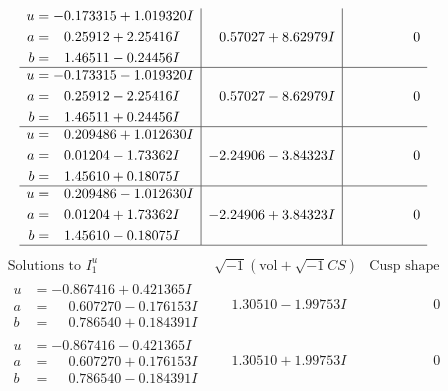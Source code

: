 \documentclass[1p]{elsarticle_modified}
\theoremstyle{definition}
\newcommand{\I}{\sqrt{-1}}
\begin{document}
$$\begin{array}{c|c|c}
\begin{aligned}
u &= -0.173315 + 1.019320 I \\
a &= \phantom{-}0.25912 + 2.25416 I \\
b &= \phantom{-}1.46511 - 0.24456 I\end{aligned}
 & \phantom{-}0.57027 + 8.62979 I & \phantom{-0.000000 } 0 \\ \hline\begin{aligned}
u &= -0.173315 - 1.019320 I \\
a &= \phantom{-}0.25912 - 2.25416 I \\
b &= \phantom{-}1.46511 + 0.24456 I\end{aligned}
 & \phantom{-}0.57027 - 8.62979 I & \phantom{-0.000000 } 0 \\ \hline\begin{aligned}
u &= \phantom{-}0.209486 + 1.012630 I \\
a &= \phantom{-}0.01204 - 1.73362 I \\
b &= \phantom{-}1.45610 + 0.18075 I\end{aligned}
 & -2.24906 - 3.84323 I & \phantom{-0.000000 } 0 \\ \hline\begin{aligned}
u &= \phantom{-}0.209486 - 1.012630 I \\
a &= \phantom{-}0.01204 + 1.73362 I \\
b &= \phantom{-}1.45610 - 0.18075 I\end{aligned}
 & -2.24906 + 3.84323 I & \phantom{-0.000000 } 0\\
 \hline 
 \end{array}$$\newpage$$\begin{array}{c|c|c}  
\text{Solutions to }I^u_{1}& \I (\text{vol} + \sqrt{-1}CS) & \text{Cusp shape}\\
 \hline 
\begin{aligned}
u &= -0.867416 + 0.421365 I \\
a &= \phantom{-}0.607270 - 0.176153 I \\
b &= \phantom{-}0.786540 + 0.184391 I\end{aligned}
 & \phantom{-}1.30510 - 1.99753 I & \phantom{-0.000000 } 0 \\ \hline\begin{aligned}
u &= -0.867416 - 0.421365 I \\
a &= \phantom{-}0.607270 + 0.176153 I \\
b &= \phantom{-}0.786540 - 0.184391 I\end{aligned}
 & \phantom{-}1.30510 + 1.99753 I & \phantom{-0.000000 } 0 \\ \hline\begin{aligned}

\end{aligned}
\end{array}$$
\end{document}

